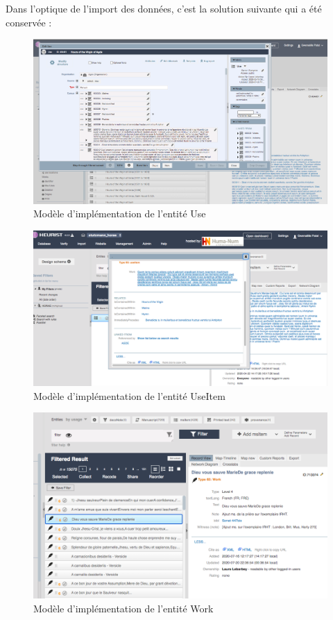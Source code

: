 \documentclass[a4paper,12pt,twoside]{book}
\begin{document}
    Dans l'optique de l'import des données, c'est la solution suivante qui a été conservée :

    \begin{figure}[!h]
    \centering
    \includegraphics[width=15cm]{img/Modelisation/choix_final_use.png}
    \caption{Modèle d'implémentation de l'entité Use}
    \end{figure}
    \clearpage
    
    \begin{figure}[!h]
    \centering
    \includegraphics[width=15cm]{img/Modelisation/choix_final_useItem.png}
    \caption{Modèle d'implémentation de l'entité UseItem}
    \end{figure}
    \clearpage
    
    \begin{figure}[!h]
    \centering
    \includegraphics[width=15cm]{img/Modelisation/choix_final_work.png}
    \caption{Modèle d'implémentation de l'entité Work}
    \end{figure}
    \clearpage
    
\end{document}
